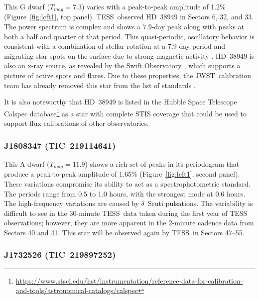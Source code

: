 \documentclass[twocolumn, linenumbers]{aastex631}
\newcommand{\jwst}{JWST}
\newcommand{\tess}{TESS}
\begin{document}
This G dwarf ($T_{mag}=7.3$) varies with a peak-to-peak amplitude of 1.2\% (Figure~\ref{fig:lcft1}, top panel). \tess\ observed HD~38949 in Sectors 6, 32, and 33.  The power spectrum is complex and shows a 7.9-day peak along with peaks at both a half and quarter of that period. This quasi-periodic, oscillatory behavior is consistent with a combination of stellar rotation at a 7.9-day period and migrating star spots on the surface due to strong magnetic activity \citep{Santos2021}.  HD~38949 is also an x-ray source, as revealed by the Swift Observatory \citep{Swift2020,Evans2020vizier}, which supports a picture of active spots and flares. Due to these properties, the \jwst\ calibration team has already removed this star from the list of standards \citep{Gordon2022inprep}.

It is also noteworthy that HD~38949 is listed in the Hubble Space Telescope Calspec database\footnote{\url{https://www.stsci.edu/hst/instrumentation/reference-data-for-calibration-and-tools/astronomical-catalogs/calspec}} \citep{Bohlin2014PASP126} as a star with complete STIS coverage that could be used to support flux calibrations of other observatories.

\vspace{2em}
\subsubsection{J1808347 (TIC~219114641)}

This A dwarf ($T_{mag}=11.9$) shows a rich set of peaks in its periodogram that produce a peak-to-peak amplitude of 1.65\% (Figure~\ref{fig:lcft1}, second panel). These variations compromise its ability to act as a spectrophotometric standard. The periods range from 0.5 to 1.0 hours, with the strongest mode at 0.6 hours.  The high-frequency variations are caused by $\delta$~Scuti pulsations.  The variability is difficult to see in the 30-minute \tess\ data taken during the first year of TESS observations; however, they are more apparent in the 2-minute cadence data from Sectors 40 and 41.  This star will be observed again by \tess\ in Sectors 47--55.  


\subsubsection{J1732526 (TIC~219897252)}
\end{document}

